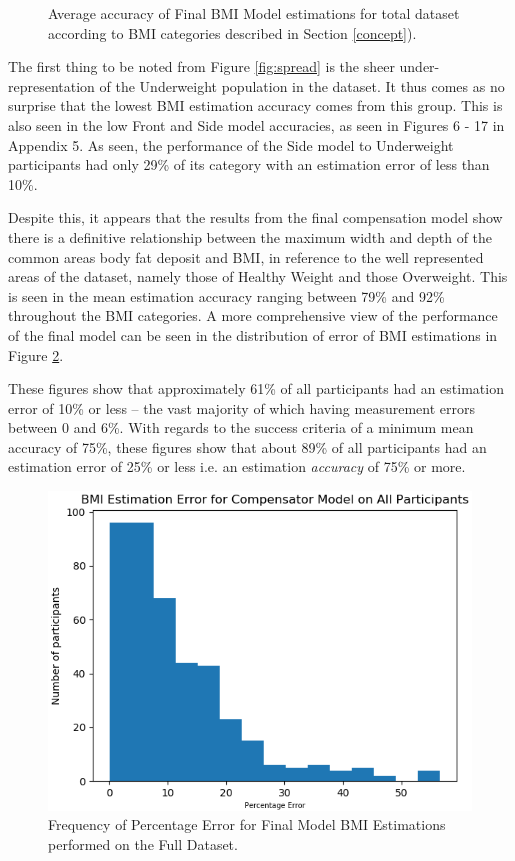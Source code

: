 \documentclass[conference]{IEEEtran}
\begin{document}
\begin{figure}
\begin{minipage}[b]{0.235\textwidth}
	\caption{Average accuracy of Final BMI Model estimations for total dataset according to BMI categories described in Section \ref{concept}).}
	\label{fig:accuracies}
    \end{minipage}
\end{figure}

The first thing to be noted from Figure \ref{fig:spread} is the sheer under-representation of the Underweight population in the dataset.
It thus comes as no surprise that the lowest BMI estimation accuracy comes from this group.
This is also seen in the low Front and Side model accuracies, as seen in Figures 6 - 17 in Appendix 5.
As seen, the performance of the Side model to Underweight participants had only 29\% of its category with an estimation error of less than 10\%.

Despite this, it appears that the results from the final compensation model show there is a definitive relationship between the maximum width and depth of the common areas body fat deposit and BMI, in reference to the well represented areas of the dataset, namely those of Healthy Weight and those Overweight.
This is seen in the mean estimation accuracy ranging between 79\% and 92\% throughout the BMI categories.
A more comprehensive view of the performance of the final model can be seen in the distribution of error of BMI estimations in Figure \ref{fig:errorspread}.

These figures show that approximately 61\% of all participants had an estimation error of 10\% or less -- the vast majority of which having measurement errors between 0 and 6\%.
With regards to the success criteria of a minimum mean accuracy of 75\%, these figures show that about 89\% of all participants had an estimation error of 25\% or less i.e. an estimation \textit{accuracy} of 75\% or more.
\begin{figure}
\centering
	\includegraphics[width=0.65\linewidth]{errorspread.png}
	\caption{Frequency of Percentage Error for Final Model BMI Estimations performed on the Full Dataset.}
	\label{fig:errorspread}
\end{figure}
\end{document}
